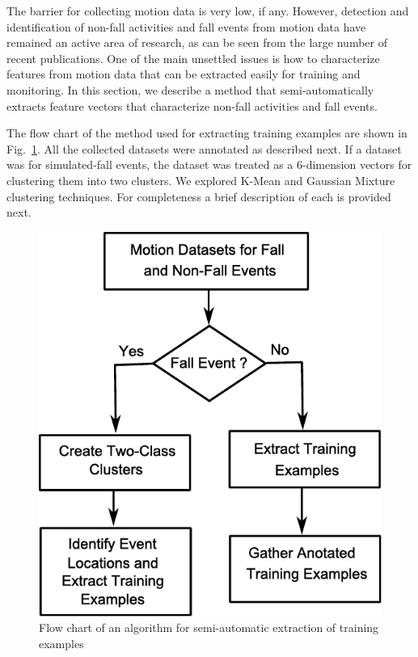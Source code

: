 \documentclass[]{IEEEtran}
\begin{document}
The barrier for collecting motion data is very low, if any. However, detection and identification of non-fall activities and fall events from motion data have remained an active area of research, as can be seen from the large number of recent publications. One of the main unsettled issues is how to characterize features from motion data that can be extracted easily for training and monitoring. In this section, we describe a method that semi-automatically extracts feature vectors that characterize non-fall activities and fall events.

The flow chart of the method used for extracting training examples are shown in Fig.~\ref{fig:FlowChartforAlgorTrainingExamples}. All the collected datasets were annotated as described next. If a dataset was for simulated-fall events, the dataset was treated as a 6-dimension vectors for clustering them into two clusters. We explored K-Mean and Gaussian Mixture clustering techniques. For completeness a brief description of each is provided next.

\begin{figure}[htb]
	\centering
		\includegraphics[width = 
		0.74\columnwidth]{figures/FlowChartAlgoForTrainingExamples.pdf}
	\caption{Flow chart of an algorithm for semi-automatic extraction of training examples}
	\label{fig:FlowChartforAlgorTrainingExamples}
\end{figure}
\end{document}
